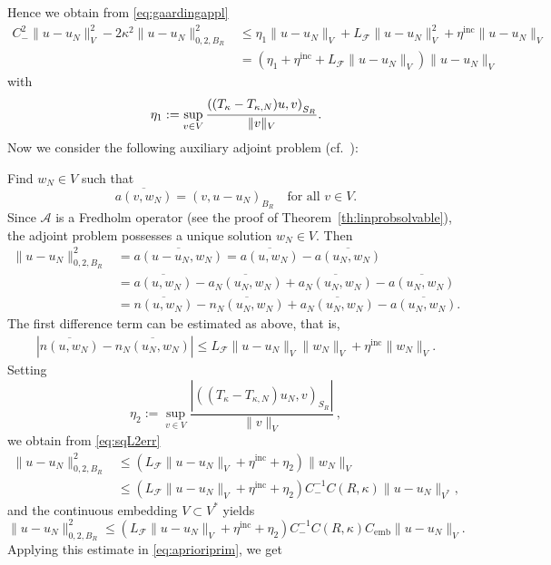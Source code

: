 \documentclass[12pt,DIV=14]{scrartcl}
\let\Re\relax\DeclareMathOperator{\Re}{Re}
\begin{document}
Hence we obtain from \eqref{eq:gaardingappl}
\begin{equation}\label{eq:aprioriprim}
\begin{aligned}
C_-^2 \|u-u_N\|_V^2 - 2\kappa^2 \|u-u_N\|_{0,2,B_R}^2
&\le \eta_1 \|u-u_N\|_V + L_\mathcal{F} \|u-u_N\|_V^2 + \eta^\mathrm{inc}\|u-u_N\|_V\\
&= \left(\eta_1 + \eta^\mathrm{inc} + L_\mathcal{F} \|u-u_N\|_V\right)\|u-u_N\|_V
\end{aligned}
\end{equation}
with
\[
\eta_1 := \sup_{v\in V}\frac{\Re \left((T_\kappa - T_{\kappa,N}) u,v\right)_{S_R}}{\|v\|_V}.
\]
Now we consider the following auxiliary adjoint problem (cf.\ \cite[p.~43]{McLean:00}):

Find $w_N\in V$ such that
\[
\overline{a(v,w_N)} = (v,u-u_N)_{B_R}
\quad\text{for all } v\in V.
\] 
Since $\mathcal{A}$ is a Fredholm operator (see the proof of Theorem~\ref{th:linprobsolvable}),
the adjoint problem possesses a unique solution $w_N\in V$.
Then
\begin{align}
\|u-u_N\|_{0,2,B_R}^2 &= \overline{a(u-u_N,w_N)}
= \overline{a(u,w_N)} - \overline{a(u_N,w_N)}
\nonumber\\
&= \overline{a(u,w_N)} - \overline{a_N(u_N,w_N)}
+ \overline{a_N(u_N,w_N)} - \overline{a(u_N,w_N)}
\label{eq:sqL2err}\\
&= \overline{n(u,w_N)} - \overline{n_N(u_N,w_N)}
+ \overline{a_N(u_N,w_N)} - \overline{a(u_N,w_N)}.
\nonumber
\end{align}
The first difference term can be estimated as above, that is,
\begin{align*}
\left|\overline{n(u,w_N)} - \overline{n_N(u_N,w_N)}\right|
\le L_\mathcal{F} \|u-u_N\|_V\|w_N\|_V + \eta^\mathrm{inc}\|w_N\|_V.
\end{align*}
Setting
\[
\eta_2 := \sup_{v\in V}\frac{\left|\left((T_\kappa - T_{\kappa,N}) u_N,v\right)_{S_R}\right|}{\|v\|_V}\,,
\]
we obtain from \eqref{eq:sqL2err}
\begin{align*}
\|u-u_N\|_{0,2,B_R}^2
&\le \left(L_\mathcal{F} \|u-u_N\|_V
+ \eta^\mathrm{inc} +\eta_2\right) \|w_N\|_V\\
&\le \left(L_\mathcal{F} \|u-u_N\|_V
+ \eta^\mathrm{inc} +\eta_2\right) C_-^{-1}C(R,\kappa) \|u-u_N\|_{V^\ast},
\end{align*}
and the continuous embedding $V\subset V^\ast$ yields
\[
\|u-u_N\|_{0,2,B_R}^2 \le \left(L_\mathcal{F} \|u-u_N\|_V
+ \eta^\mathrm{inc} +\eta_2\right) C_-^{-1}C(R,\kappa) C_\mathrm{emb}\|u-u_N\|_V.
\]
Applying this estimate in \eqref{eq:aprioriprim}, we get
\end{document}

